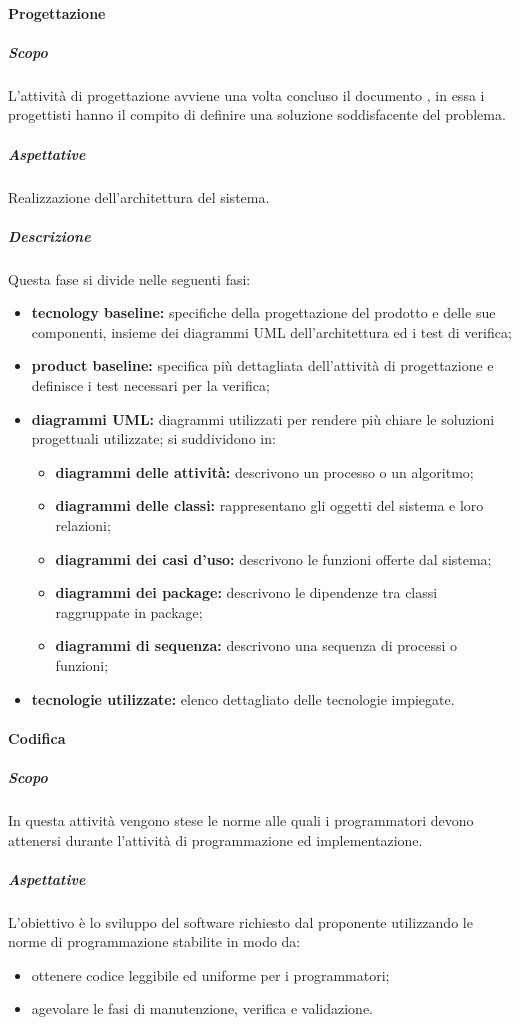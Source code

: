			\paragraph {Progettazione}
				\subparagraph{Scopo}
					L'attività di progettazione avviene una volta concluso il documento , in essa i progettisti hanno il compito di definire una soluzione soddisfacente del problema.
				\subparagraph{Aspettative}
					Realizzazione dell'architettura del sistema.
				\subparagraph{Descrizione}
					Questa fase si divide nelle seguenti fasi: 
					\begin{itemize}
						\item \textbf{tecnology baseline:} specifiche della progettazione del prodotto e delle sue componenti, insieme dei diagrammi UML dell'architettura ed i test di verifica;
						\item \textbf{product baseline:} specifica più dettagliata dell'attività di progettazione e definisce i test necessari per la verifica;
						\item \textbf{diagrammi UML:} diagrammi utilizzati per rendere più chiare le soluzioni progettuali utilizzate; si suddividono in:	
						\begin{itemize}
							\item \textbf{diagrammi delle attività:} descrivono un processo o un algoritmo;
							\item \textbf{diagrammi delle classi:} rappresentano gli oggetti del sistema e loro relazioni;
							\item \textbf{diagrammi dei casi d'uso:} descrivono le funzioni offerte dal sistema;
							\item \textbf{diagrammi dei package:} descrivono le dipendenze tra classi raggruppate in package;
							\item \textbf{diagrammi di sequenza:} descrivono una sequenza di processi o funzioni;
						\end{itemize}
						\item \textbf{tecnologie utilizzate:} elenco dettagliato delle tecnologie impiegate.
						\end{itemize}	
				
			\paragraph{Codifica}
				\subparagraph{Scopo}	
					In questa attività vengono stese le norme alle quali i programmatori devono attenersi durante l’attività di programmazione ed implementazione.
				\subparagraph{Aspettative}
					 L’obiettivo è lo sviluppo del software richiesto dal proponente utilizzando le norme di programmazione stabilite in modo da:
					 	\begin{itemize}
					 	\item ottenere codice leggibile ed uniforme per i programmatori;
					 	\item agevolare le fasi di manutenzione, verifica e validazione.
					 \end{itemize} 

